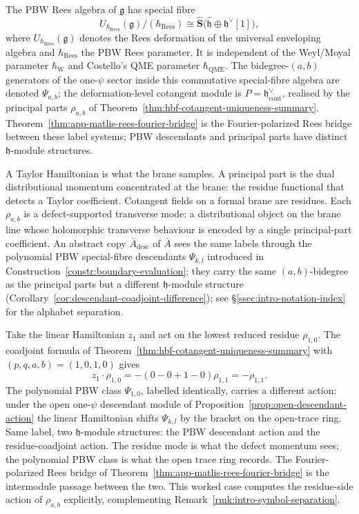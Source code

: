 \documentclass[11pt]{memoir}
\begin{document}
The PBW Rees algebra of \(\mathfrak g\) has special fibre
\[
U_{\hbar_{\mathrm{Rees}}}(\mathfrak g)/(\hbar_{\mathrm{Rees}})
  \cong\widehat{\mathbf S}\bigl(\widehat{\mathfrak h}
    \oplus\mathfrak h^\vee[1]\bigr),
\]
where \(U_{\hbar_{\mathrm{Rees}}}(\mathfrak g)\) denotes the Rees
deformation of the universal enveloping algebra and
\(\hbar_{\mathrm{Rees}}\) the PBW Rees parameter. It is independent of
the Weyl/Moyal parameter \(\hbar_{\mathrm{W}}\) and Costello's QME
parameter \(\hbar_{\mathrm{QME}}\).  The bidegree-\((a,b)\) generators of the one-\(\psi\)
sector inside this commutative special-fibre algebra are denoted
\(\Psi_{a,b}\); the deformation-level cotangent module is
\(P=\mathfrak h^\vee_{\mathrm{cont}}\), realised by the principal
parts \(\rho_{a,b}\) of
Theorem~\ref{thm:hbf-cotangent-uniqueness-summary}.
Theorem~\ref{thm:app-matlis-rees-fourier-bridge} is the
Fourier-polarized Rees bridge between these label systems; PBW
descendants and principal parts have distinct \(\mathfrak h\)-module
structures.

A Taylor Hamiltonian is what the brane samples.  A principal part is
the dual distributional momentum concentrated at the brane: the
residue functional that detects a Taylor coefficient.  Cotangent
fields on a formal brane are residues.  Each
\(\rho_{a,b}\) is a defect-supported transverse mode: a distributional
object on the brane line whose holomorphic transverse behaviour is
encoded by a single principal-part coefficient.  An abstract copy
\(\bar A_{\mathrm{desc}}\) of \(\bar A\) sees the same labels through
the polynomial PBW special-fibre descendants \(\Psi_{k,l}\) introduced in
Construction~\ref{constr:boundary-evaluation}; they carry the same
\((a,b)\)-bidegree as the principal parts but a different
\(\mathfrak h\)-module structure
(Corollary~\ref{cor:descendant-coadjoint-difference}); see
\S\ref{ssec:intro-notation-index} for the alphabet separation.

\begin{ex}\label{ex:residue-mode-rho10}
  Take the linear Hamiltonian \(z_1\) and act on the lowest reduced
  residue \(\rho_{1,0}\).  The coadjoint formula of
  Theorem~\ref{thm:hbf-cotangent-uniqueness-summary} with
  \((p,q,a,b)=(1,0,1,0)\) gives
  \[
    z_1\cdot\rho_{1,0}=-(0-0+1-0)\rho_{1,1}=-\rho_{1,1}.
  \]
  The polynomial PBW class \(\Psi_{1,0}\), labelled identically,
  carries a different action: under the open one-\(\psi\) descendant
  module of Proposition~\ref{prop:open-descendant-action} the linear
  Hamiltonian shifts \(\Psi_{k,l}\) by the bracket on the
  open-trace ring.  Same label, two \(\mathfrak h\)-module structures:
  the PBW descendant action and the residue-coadjoint action.  The residue mode is what the
  defect momentum sees; the polynomial PBW class is what the open
  trace ring records.  The Fourier-polarized Rees bridge of
  Theorem~\ref{thm:app-matlis-rees-fourier-bridge} is the
  intermodule passage between the two.  This worked case computes
  the residue-side action of \(\rho_{a,b}\) explicitly, complementing
  Remark~\ref{rmk:intro-symbol-separation}.
\end{ex}
\end{document}
